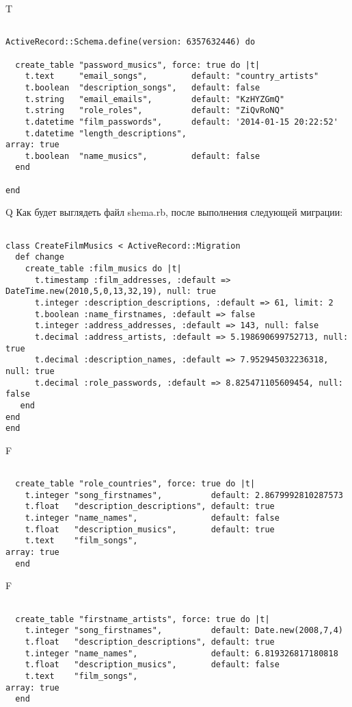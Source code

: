 T
\begin{verbatim}

ActiveRecord::Schema.define(version: 6357632446) do

  create_table "password_musics", force: true do |t|
    t.text     "email_songs",         default: "country_artists"
    t.boolean  "description_songs",   default: false
    t.string   "email_emails",        default: "KzHYZGmQ"
    t.string   "role_roles",          default: "ZiQvRoNQ"
    t.datetime "film_passwords",      default: '2014-01-15 20:22:52'
    t.datetime "length_descriptions",                                 array: true
    t.boolean  "name_musics",         default: false
  end

end
\end{verbatim}

Q
Как будет выглядеть файл shema.rb, после выполнения следующей миграции:

\begin{verbatim}

class CreateFilmMusics < ActiveRecord::Migration 
  def change 
    create_table :film_musics do |t| 
      t.timestamp :film_addresses, :default => DateTime.new(2010,5,0,13,32,19), null: true
      t.integer :description_descriptions, :default => 61, limit: 2
      t.boolean :name_firstnames, :default => false
      t.integer :address_addresses, :default => 143, null: false
      t.decimal :address_artists, :default => 5.198690699752713, null: true
      t.decimal :description_names, :default => 7.952945032236318, null: true
      t.decimal :role_passwords, :default => 8.825471105609454, null: false
   end
end
end
\end{verbatim}

F
\begin{verbatim}

  create_table "role_countries", force: true do |t|
    t.integer "song_firstnames",          default: 2.8679992810287573
    t.float   "description_descriptions", default: true
    t.integer "name_names",               default: false
    t.float   "description_musics",       default: true
    t.text    "film_songs",                                                          array: true
  end

\end{verbatim}

F
\begin{verbatim}

  create_table "firstname_artists", force: true do |t|
    t.integer "song_firstnames",          default: Date.new(2008,7,4)
    t.float   "description_descriptions", default: true
    t.integer "name_names",               default: 6.819326817180818
    t.float   "description_musics",       default: false
    t.text    "film_songs",                                                          array: true
  end

\end{verbatim}

